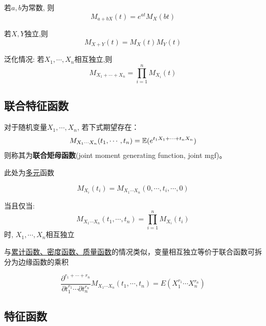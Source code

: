 \begin{proposition}
    若$a,b$为常数, 则
    \[ M_{a+b X}(t) = e^{a t}M_X(b t) \]
\end{proposition}

\begin{theorem}\label{thm:mgf_sum}
    若$X,Y$独立,则
    \[ M_{X+Y}(t) = M_X(t) M_Y(t) \]

    泛化情况: 若$X_1,\cdots, X_n$相互独立,则
    \[ M_{X_1+\cdots+ X_n} = \prod_{i=1}^n M_{X_i}(t)\]
\end{theorem}

\subsection{联合特征函数}

\begin{definition}
    对于随机变量$X_1,\cdots, X_n$, 若下式期望存在：
    \[ M_{X_1\cdots X_n}(t_1,\cdots ,t_n) = \mathbb{E}(e^{t_1 X_1+\cdots + t_n X_n}) \]
    则称其为\textbf{联合矩母函数}(joint moment generating function, joint mgf)。
\end{definition}

\begin{remark}
    此处为\underline{多元}函数
\end{remark}

\begin{proposition}
    \[ M_{X_i}(t_i) = M_{X_1\cdots X_n}(0,\cdots ,t_i,\cdots ,0) \]
\end{proposition}

\begin{theorem}
    当且仅当:
    \[ M_{X_1\cdots X_n}(t_1,\cdots ,t_n) = \prod_{i=1}^n M_{X_i}(t_i) \]
    时, $X_1,\cdots, X_n$相互独立
\end{theorem}

\begin{remark}
    与\underline{累计函数、密度函数、质量函数}的情况类似，变量相互独立等价于联合函数可拆分为边缘函数的乘积
\end{remark}

\begin{theorem}
    \[ \frac{\partial^{r_1+\cdots +r_n} }{\partial t_1^{r_1} \cdots  \partial t_n^{r_n}} M_{X_1\cdots X_n}(t_1,\cdots ,t_n) = E(X_1^{r_1} \cdots X_n^{r_n}) \]
\end{theorem}

\subsection{特征函数}


